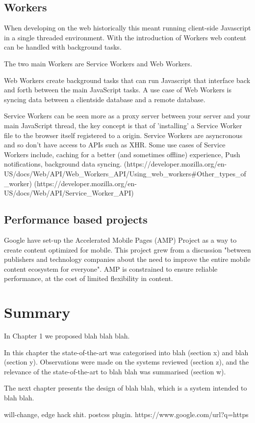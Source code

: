 
\subsection{Workers}

When developing on the web historically this meant running client-side Javascript in a single threaded environment. With the introduction of Workers web content can be handled with background tasks.

The two main Workers are Service Workers and Web Workers.

Web Workers create background tasks that can run Javascript that interface back and forth between the main JavaScript tasks. A use case of Web Workers is syncing data between a clientside database and a remote database.

Service Workers can be seen more as a proxy server between your server and your main JavaScript thread, the key concept is that of 'installing' a Service Worker file to the browser itself registered to a origin. Service Workers are asyncronous and so don't have access to APIs such as XHR.
Some use cases of Service Workers include, caching for a better (and sometimes offline) experience, Push notifications, background data syncing.
(https://developer.mozilla.org/en-US/docs/Web/API/Web_Workers_API/Using_web_workers#Other_types_of_worker)
(https://developer.mozilla.org/en-US/docs/Web/API/Service_Worker_API)


\subsection{Performance based projects}

Google have set-up the Accelerated Mobile Pages (AMP) Project as a way to create content optimized for mobile. This project grew from a discussion "between publishers and technology companies about the need to improve the entire mobile content ecosystem for everyone". AMP is constrained to ensure reliable performance, at the cost of limited flexibility in content.


\section{Summary} \label{l-r--summary}

In Chapter 1 we proposed blah blah blah.

In this chapter the state-of-the-art was categorised into blah (section x) and  blah (section y).  Observations were made on the systems reviewed (section z), and the relevance of the state-of-the-art to blah blah was summarised (section w).

The next chapter presents the design of blah blah, which is a system intended to blah blah.

will-change, edge hack shit. postcss plugin. https://www.google.com/url?q=https%

